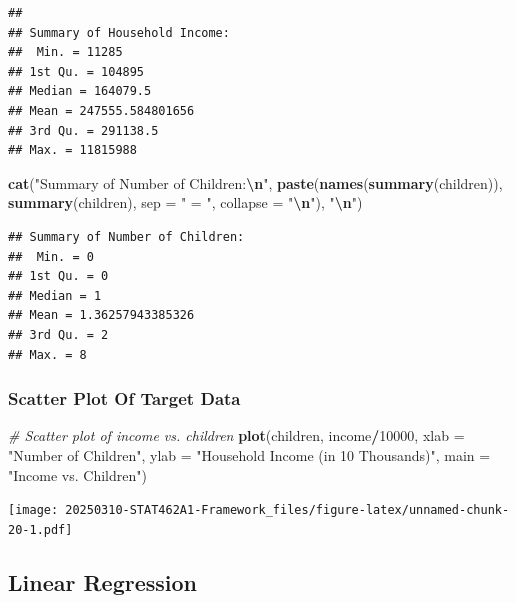 \documentclass[
]{article}
\newenvironment{Shaded}{\begin{snugshade}}{\end{snugshade}}
\newcommand{\AttributeTok}[1]{\textcolor[rgb]{0.13,0.29,0.53}{#1}}
\newcommand{\CommentTok}[1]{\textcolor[rgb]{0.56,0.35,0.01}{\textit{#1}}}
\newcommand{\DecValTok}[1]{\textcolor[rgb]{0.00,0.00,0.81}{#1}}
\newcommand{\FunctionTok}[1]{\textcolor[rgb]{0.13,0.29,0.53}{\textbf{#1}}}
\newcommand{\NormalTok}[1]{#1}
\newcommand{\SpecialCharTok}[1]{\textcolor[rgb]{0.81,0.36,0.00}{\textbf{#1}}}
\newcommand{\StringTok}[1]{\textcolor[rgb]{0.31,0.60,0.02}{#1}}
\begin{document}
\begin{verbatim}
## 
## Summary of Household Income:
##  Min. = 11285
## 1st Qu. = 104895
## Median = 164079.5
## Mean = 247555.584801656
## 3rd Qu. = 291138.5
## Max. = 11815988
\end{verbatim}

\begin{Shaded}
\begin{Highlighting}[]
\FunctionTok{cat}\NormalTok{(}\StringTok{"Summary of Number of Children:}\SpecialCharTok{\textbackslash{}n}\StringTok{"}\NormalTok{, }
    \FunctionTok{paste}\NormalTok{(}\FunctionTok{names}\NormalTok{(}\FunctionTok{summary}\NormalTok{(children)), }\FunctionTok{summary}\NormalTok{(children), }\AttributeTok{sep =} \StringTok{" = "}\NormalTok{, }\AttributeTok{collapse =} \StringTok{"}\SpecialCharTok{\textbackslash{}n}\StringTok{"}\NormalTok{), }\StringTok{"}\SpecialCharTok{\textbackslash{}n}\StringTok{"}\NormalTok{)}
\end{Highlighting}
\end{Shaded}

\begin{verbatim}
## Summary of Number of Children:
##  Min. = 0
## 1st Qu. = 0
## Median = 1
## Mean = 1.36257943385326
## 3rd Qu. = 2
## Max. = 8
\end{verbatim}

\subsubsection{Scatter Plot Of Target
Data}\label{scatter-plot-of-target-data}

\begin{Shaded}
\begin{Highlighting}[]
\CommentTok{\# Scatter plot of income vs. children}
\FunctionTok{plot}\NormalTok{(children, income}\SpecialCharTok{/}\DecValTok{10000}\NormalTok{, }\AttributeTok{xlab =} \StringTok{"Number of Children"}\NormalTok{, }\AttributeTok{ylab =} \StringTok{"Household Income (in 10 Thousands)"}\NormalTok{, }\AttributeTok{main =} \StringTok{"Income vs. Children"}\NormalTok{)}
\end{Highlighting}
\end{Shaded}

\texttt{[image: 20250310-STAT462A1-Framework\_files/figure-latex/unnamed-chunk-20-1.pdf]}

\subsection{Linear Regression}\label{linear-regression}
\end{document}
